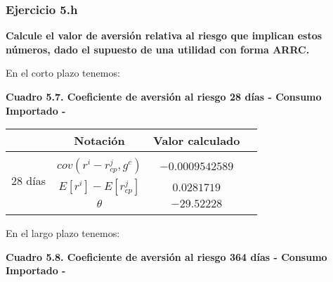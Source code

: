\documentclass[
]{article}
\begin{document}
\hypertarget{ejercicio-5.h}{%
\subsubsection{Ejercicio 5.h}\label{ejercicio-5.h}}

\textbf{Calcule el valor de aversión relativa al riesgo que implican
estos números, dado el supuesto de una utilidad con forma ARRC.}

En el corto plazo tenemos:

\begin{center}
\textbf{Cuadro 5.7. Coeficiente de aversión al riesgo 28 días - Consumo Importado -}
\end{center}

\begin{table}[h!]
                \begin{center} 
                    \begin{tabular}{|c|c|c|c|} 
                        \hline 
                        \mbox{}\;\;\;\;\;\mbox{}& \; Notación\;  & \; Valor calculado\; \\ 
                        \hline 
                        \multirow{4}{*}{\begin{sideways}28 días\end{sideways}}  
                            &   &  \\
                        &$cov(r^i-r_{cp}^j, g^c)$  & $-0.0009542589$ \\
                        &$E[r^i]-E[r^j_{cp}]$ & $0.0281719$ \\ 
                        &$\theta$ & $-29.52228$ \\ 
                        &  &   \\
                        \hline \hline
                        \hline
                    \end{tabular}
                \end{center}
\end{table}

En el largo plazo tenemos:

\begin{center}
\textbf{Cuadro 5.8. Coeficiente de aversión al riesgo 364 días - Consumo Importado -}
\end{center}
\end{document}
